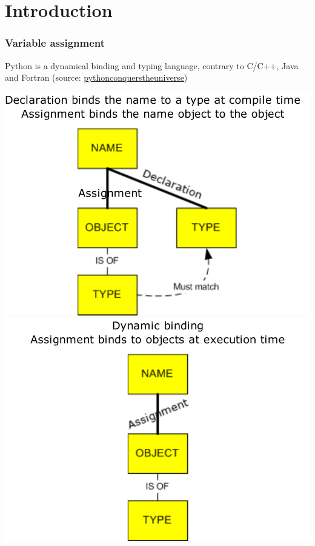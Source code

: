 \section{Introduction}



\begin{frame}[fragile]
\frametitle{Variable assignment}

    Python is a dynamical binding and typing language, contrary to C/C++, Java and Fortran (source: \href{https://pythonconquerstheuniverse.wordpress.com/2009/10/03/static-vs-dynamic-typing-of-programming-languages/}{pythonconquerstheuniverse})

    \begin{center}
    \includegraphics[scale=0.4]{figs/static_typing.pdf}
    \includegraphics[scale=0.4]{figs/dynamic_typing.pdf}
    \end{center}


\end{frame}
